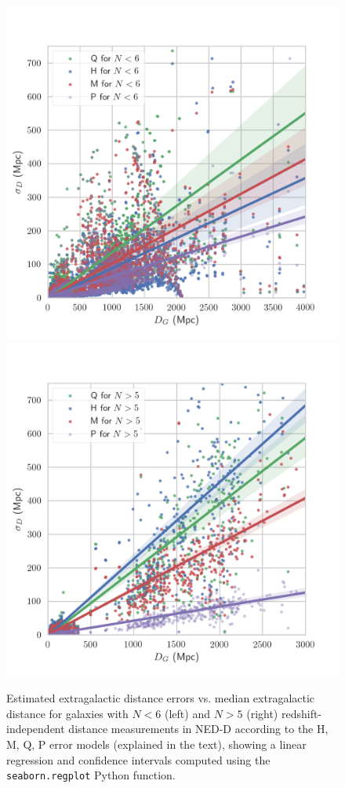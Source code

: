 \documentclass[a4paper,fleqn,usenatbib]{mnras}
\begin{document}
\begin{figure}
	\includegraphics[scale=0.69]{Nlow.png}
	\includegraphics[scale=0.69]{Nhigh.png}
    \caption{Estimated extragalactic distance errors vs. median extragalactic distance for galaxies with $N<6$ (left) and $N>5$ (right)  redshift-independent distance measurements in NED-D according to the H, M, Q, P error models  (explained in the text), showing a linear regression and confidence intervals computed using the \texttt{seaborn.regplot} Python function.}
    \label{fig:NED}
\end{figure}
\end{document}
